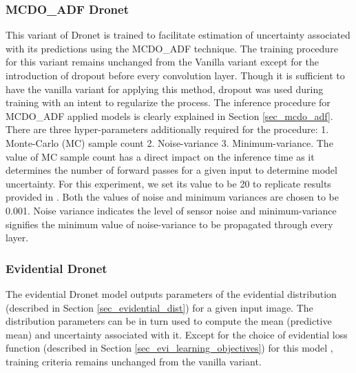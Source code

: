 \subsubsection{MCDO\_ADF Dronet}
This variant of Dronet is trained to facilitate estimation of uncertainty associated with its predictions using the MCDO\_ADF technique. The training procedure for this variant remains unchanged from the Vanilla variant except for the  introduction of dropout before every convolution layer. Though it is sufficient to have the vanilla variant for applying this method, dropout was used during training with an intent to regularize the process. The inference procedure for MCDO\_ADF applied models is clearly explained in Section \ref{sec_mcdo_adf}. There are three hyper-parameters additionally required for the procedure: 1. Monte-Carlo (MC) sample count 2. Noise-variance 3. Minimum-variance. The value of MC sample count has a direct impact on the inference time as it determines the number of forward passes for a given input to determine model uncertainty. For this experiment, we set its value to be 20 to replicate results provided in \cite{loquercio2020a}. Both the values of noise and minimum variances are chosen to be 0.001. Noise variance indicates the level of sensor noise and minimum-variance signifies the minimum value of noise-variance to be propagated through every layer.
\subsubsection{Evidential Dronet}
The evidential Dronet model outputs parameters of the evidential distribution (described in Section \ref{sec_evidential_dist}) for a given input image. The distribution parameters can be in turn used to compute the mean (predictive mean) and uncertainty associated with it. Except for the choice of evidential loss function (described in Section \ref{sec_evi_learning_objectives}) for this model , training criteria remains unchanged from the vanilla variant.
